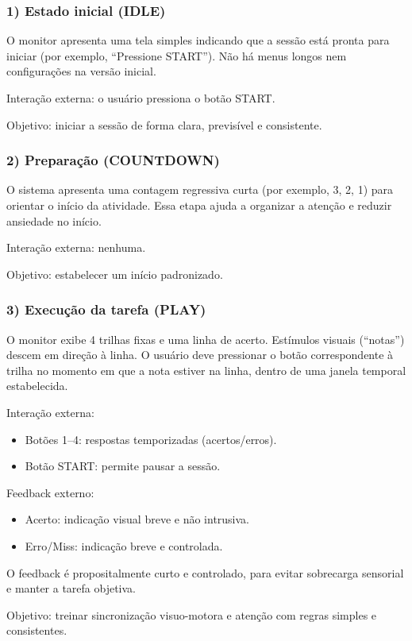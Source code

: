 \documentclass[a4paper,12pt,twoside]{article}
\begin{document}
\subsubsection{1) Estado inicial (IDLE)}
O monitor apresenta uma tela simples indicando que a sessão está pronta para iniciar (por exemplo, ``Pressione START''). Não há menus longos nem configurações na versão inicial.

Interação externa: o usuário pressiona o botão START.

Objetivo: iniciar a sessão de forma clara, previsível e consistente.

\subsubsection{2) Preparação (COUNTDOWN)}
O sistema apresenta uma contagem regressiva curta (por exemplo, 3, 2, 1) para orientar o início da atividade. Essa etapa ajuda a organizar a atenção e reduzir ansiedade no início.

Interação externa: nenhuma.

Objetivo: estabelecer um início padronizado.

\subsubsection{3) Execução da tarefa (PLAY)}
O monitor exibe 4 trilhas fixas e uma linha de acerto. Estímulos visuais (``notas'') descem em direção à linha. O usuário deve pressionar o botão correspondente à trilha no momento em que a nota estiver na linha, dentro de uma janela temporal estabelecida.

Interação externa:
\begin{itemize}
    \item Botões 1--4: respostas temporizadas (acertos/erros).
    \item Botão START: permite pausar a sessão.
\end{itemize}

Feedback externo:
\begin{itemize}
    \item Acerto: indicação visual breve e não intrusiva.
    \item Erro/Miss: indicação breve e controlada.
\end{itemize}

O feedback é propositalmente curto e controlado, para evitar sobrecarga sensorial e manter a tarefa objetiva.

Objetivo: treinar sincronização visuo-motora e atenção com regras simples e consistentes.
\end{document}
